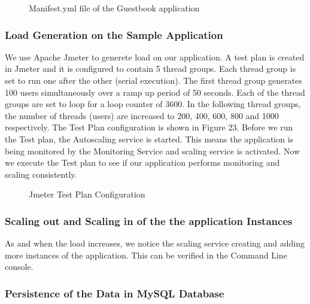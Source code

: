 \documentclass[article,type=msc,colorback,12pt,accentcolor=tud7b]{tudthesis}
\begin{document}
 \begin{figure}[h]
 \begin{center}
  \makebox[\textwidth]{\texttt{[image: D3]}}
\end{center}
\caption{Manifest.yml file of the Guestbook application}
\end{figure}
	
	\subsubsection{Load Generation on the Sample Application}
	
 We use Apache Jmeter to generete load on our application. A test plan is created in Jmeter and it is configured to contain 5 thread groups. Each thread group is set to run one after the other (serial execution). The first thread group generates 100 users simultaneously over a ramp up period of 50 seconds. Each of the thread groups are set to loop for a loop counter of 3600. In the following thread groups, the number of threads (users) are increased to 200, 400, 600, 800 and 1000 respectively. The Test Plan configuration is shown in Figure 23. Before we run the Test plan, the Autoscaling service is started. This means the application is being monitored by the Monitoring Service and scaling service is activated. Now we execute the Test plan to see if our application performs monitoring and scaling consistently.
 
  \begin{figure}[h]
  	\begin{center}
  		\makebox[\textwidth]{\texttt{[image: D9]}}
  	\end{center}
  	\caption{Jmeter Test Plan Configuration}
  \end{figure}
	
	\subsubsection{Scaling out and Scaling in of the the application Instances}
		
	As and when the load increases, we notice the scaling service creating and adding more instances of the application. This can be verified in the Command Line console. 
	
	\subsubsection{Persistence of the Data in MySQL Database}
	
\end{document}
